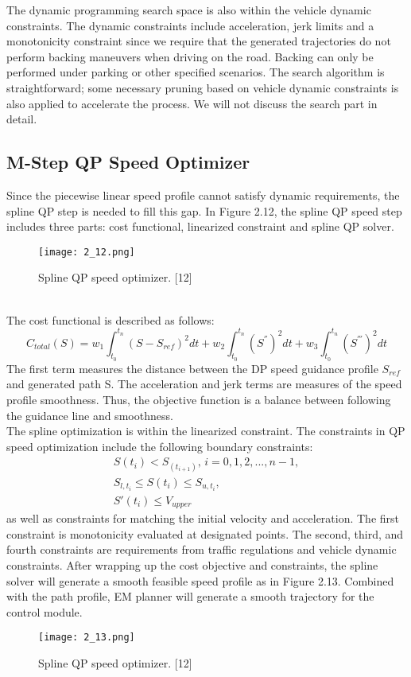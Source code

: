 \documentclass{thesisreport}
\begin{document}
\indent
The dynamic programming search space is also
within the vehicle dynamic constraints. The dynamic constraints include acceleration, jerk limits and a monotonicity constraint since we require that the generated trajectories do not perform backing maneuvers when driving on the road. Backing can only be performed under parking or other specified scenarios. The search algorithm is straightforward; some necessary pruning based on vehicle dynamic constraints is also applied to accelerate the process. We will not discuss the search part in detail.

\subsection{M-Step QP Speed Optimizer}
Since the piecewise linear speed profile cannot satisfy dynamic requirements, the spline QP step is needed to fill this gap. In Figure 2.12, the spline QP speed step includes three parts: cost functional, linearized constraint and spline QP solver.
 \begin{figure}[ht]
	\centering
	\texttt{[image: 2\_12.png]}
	\caption{Spline QP speed optimizer. [12]}
	\label{fig:2.12} 
\end{figure}\\
\indent
The cost functional is described as follows:
\begin{equation}
C_{total}(S) = w_1 \int_{t_0}^{t_n} (S - S_{ref})^2dt + w_2 \int_{t_0}^{t_n}(S^{''})^2dt + w_3 \int_{t_0}^{t_n} (S^{'''})^2dt 
\end{equation}
The first term measures the distance between the DP speed guidance profile $S_{ref}$ and generated path S. The acceleration and jerk terms are measures of the speed profile smoothness. Thus, the objective function is a balance between following the guidance line and smoothness.\\
\indent
The spline optimization is within the linearized constraint. The constraints in QP speed optimization include the following boundary constraints:
\begin{equation}
 \begin{array}{cl}
 S(t_i) < S_(t_{i+1}), \, i=0,1,2,..., n-1,\\
 S_{l,t_i} \leq S(t_i) \leq S_{u,t_i},\\
 S'(t_i) \leq V_{upper}

 \end{array}
\end{equation}
as well as constraints for matching the initial velocity and acceleration. The first constraint is monotonicity evaluated at designated points. The second, third, and fourth constraints are requirements from traffic regulations and vehicle dynamic constraints. After wrapping up the cost objective and constraints, the spline solver will generate a smooth feasible speed profile as in Figure 2.13. Combined with the path profile, EM planner will generate a smooth trajectory for the control module.
\begin{figure}[ht]
	\centering
	\texttt{[image: 2\_13.png]}
	\caption{Spline QP speed optimizer. [12]}
	\label{fig:2.13} 
\end{figure}
\end{document}
